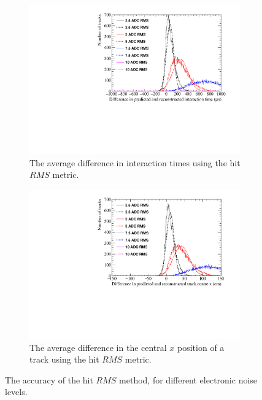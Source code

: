 \begin{figure}[h!]
  \centering
  \begin{subfigure}{0.6\textwidth}
    \centering
    \includegraphics[width=\textwidth]{Canvas_AvDiff_T_RMS_NoiseLevel}
    \caption{The average difference in interaction times using the hit $RMS$ metric.}
    \label{fig:DiffNoiseStudy_AvDiffRMS_T}
  \end{subfigure}
  \begin{subfigure}{0.6\textwidth}
    \centering
    \includegraphics[width=\textwidth]{Canvas_AvDiff_X_RMS_NoiseLevel}
    \caption{The average difference in the central $x$ position of a track using the hit $RMS$ metric.}
    \label{fig:DiffNoiseStudy_AvDiffRMS_X}
  \end{subfigure}
  \caption[Comparing the accuracy of the hit $RMS$ method, as the electronic noise changes]
          {The accuracy of the hit $RMS$ method, for different electronic noise levels.}
  \label{fig:DiffNoiseStudy_AvDiff_RMS}
\end{figure}

